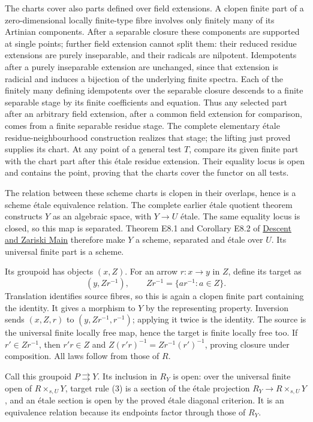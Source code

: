 \documentclass[11pt,a4paper,openany]{report}
\begin{document}
The charts cover also parts defined over field extensions. A clopen finite part of a zero-dimensional locally finite-type fibre involves only finitely many of its Artinian components. After a separable closure these components are supported at single points; further field extension cannot split them: their reduced residue extensions are purely inseparable, and their radicals are nilpotent. Idempotents after a purely inseparable extension are unchanged, since that extension is radicial and induces a bijection of the underlying finite spectra. Each of the finitely many defining idempotents over the separable closure descends to a finite separable stage by its finite coefficients and equation. Thus any selected part after an arbitrary field extension, after a common field extension for comparison, comes from a finite separable residue stage. The complete elementary étale residue-neighbourhood construction realizes that stage; the lifting just proved supplies its chart. At any point of a general test \(T\), compare its given finite part with the chart part after this étale residue extension. Their equality locus is open and contains the point, proving that the charts cover the functor on all tests.

The relation between these scheme charts is clopen in their overlaps, hence is a scheme étale equivalence relation. The complete earlier étale quotient theorem constructs \(Y\) as an algebraic space, with \(Y\to U\) étale. The same equality locus is closed, so this map is separated. Theorem E8.1 and Corollary E8.2 of \href{https://github.com/KokunoYumeto/open-math-courses/blob/main/docs/courses/AG-RG/AG-RG-S04.md}{Descent and Zariski Main} therefore make \(Y\) a scheme, separated and étale over \(U\). Its universal finite part is a scheme.

Its groupoid has objects \((x,Z)\). For an arrow \(r:x\to y\) in \(Z\), define its target as \[
  (y,Zr^{-1}),\qquad Zr^{-1}=\{ar^{-1}:a\in Z\}.
  \tag{3}
  \] Translation identifies source fibres, so this is again a clopen finite part containing the identity. It gives a morphism to \(Y\) by the representing property. Inversion sends \((x,Z,r)\) to \((y,Zr^{-1},r^{-1})\); applying it twice is the identity. The source is the universal finite locally free map, hence the target is finite locally free too. If \(r'\in Zr^{-1}\), then \(r'r\in Z\) and \(Z(r'r)^{-1}=Zr^{-1}(r')^{-1}\), proving closure under composition. All laws follow from those of \(R\).

Call this groupoid \(P\rightrightarrows Y\). Its inclusion in \(R_Y\) is open: over the universal finite open of \(R\times_{s,U}Y\), target rule (3) is a section of the étale projection \(R_Y\to R\times_{s,U}Y\), and an étale section is open by the proved étale diagonal criterion. It is an equivalence relation because its endpoints factor through those of \(R_Y\).
\end{document}
